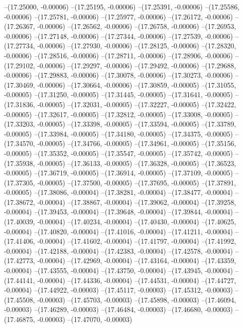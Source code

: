 --(17.25000, -0.00006)
--(17.25195, -0.00006)
--(17.25391, -0.00006)
--(17.25586, -0.00006)
--(17.25781, -0.00006)
--(17.25977, -0.00006)
--(17.26172, -0.00006)
--(17.26367, -0.00006)
--(17.26562, -0.00006)
--(17.26758, -0.00006)
--(17.26953, -0.00006)
--(17.27148, -0.00006)
--(17.27344, -0.00006)
--(17.27539, -0.00006)
--(17.27734, -0.00006)
--(17.27930, -0.00006)
--(17.28125, -0.00006)
--(17.28320, -0.00006)
--(17.28516, -0.00006)
--(17.28711, -0.00006)
--(17.28906, -0.00006)
--(17.29102, -0.00006)
--(17.29297, -0.00006)
--(17.29492, -0.00006)
--(17.29688, -0.00006)
--(17.29883, -0.00006)
--(17.30078, -0.00006)
--(17.30273, -0.00006)
--(17.30469, -0.00006)
--(17.30664, -0.00006)
--(17.30859, -0.00005)
--(17.31055, -0.00005)
--(17.31250, -0.00005)
--(17.31445, -0.00005)
--(17.31641, -0.00005)
--(17.31836, -0.00005)
--(17.32031, -0.00005)
--(17.32227, -0.00005)
--(17.32422, -0.00005)
--(17.32617, -0.00005)
--(17.32812, -0.00005)
--(17.33008, -0.00005)
--(17.33203, -0.00005)
--(17.33398, -0.00005)
--(17.33594, -0.00005)
--(17.33789, -0.00005)
--(17.33984, -0.00005)
--(17.34180, -0.00005)
--(17.34375, -0.00005)
--(17.34570, -0.00005)
--(17.34766, -0.00005)
--(17.34961, -0.00005)
--(17.35156, -0.00005)
--(17.35352, -0.00005)
--(17.35547, -0.00005)
--(17.35742, -0.00005)
--(17.35938, -0.00005)
--(17.36133, -0.00005)
--(17.36328, -0.00005)
--(17.36523, -0.00005)
--(17.36719, -0.00005)
--(17.36914, -0.00005)
--(17.37109, -0.00005)
--(17.37305, -0.00005)
--(17.37500, -0.00005)
--(17.37695, -0.00005)
--(17.37891, -0.00005)
--(17.38086, -0.00004)
--(17.38281, -0.00004)
--(17.38477, -0.00004)
--(17.38672, -0.00004)
--(17.38867, -0.00004)
--(17.39062, -0.00004)
--(17.39258, -0.00004)
--(17.39453, -0.00004)
--(17.39648, -0.00004)
--(17.39844, -0.00004)
--(17.40039, -0.00004)
--(17.40234, -0.00004)
--(17.40430, -0.00004)
--(17.40625, -0.00004)
--(17.40820, -0.00004)
--(17.41016, -0.00004)
--(17.41211, -0.00004)
--(17.41406, -0.00004)
--(17.41602, -0.00004)
--(17.41797, -0.00004)
--(17.41992, -0.00004)
--(17.42188, -0.00004)
--(17.42383, -0.00004)
--(17.42578, -0.00004)
--(17.42773, -0.00004)
--(17.42969, -0.00004)
--(17.43164, -0.00004)
--(17.43359, -0.00004)
--(17.43555, -0.00004)
--(17.43750, -0.00004)
--(17.43945, -0.00004)
--(17.44141, -0.00004)
--(17.44336, -0.00004)
--(17.44531, -0.00004)
--(17.44727, -0.00004)
--(17.44922, -0.00003)
--(17.45117, -0.00003)
--(17.45312, -0.00003)
--(17.45508, -0.00003)
--(17.45703, -0.00003)
--(17.45898, -0.00003)
--(17.46094, -0.00003)
--(17.46289, -0.00003)
--(17.46484, -0.00003)
--(17.46680, -0.00003)
--(17.46875, -0.00003)
--(17.47070, -0.00003)
